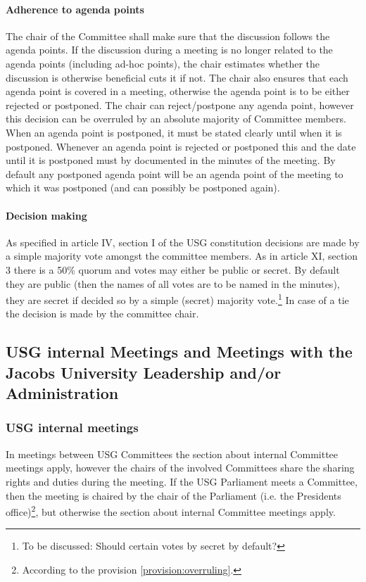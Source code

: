 \paragraph{Adherence to agenda points}
The chair of the Committee shall make sure that the discussion follows the agenda points. If the discussion during a meeting is no longer related to the agenda points (including ad-hoc points), the chair estimates whether the discussion is otherwise beneficial cuts it if not. 
The chair also ensures that each agenda point is covered in a meeting, otherwise the agenda point is to be either rejected or postponed. The chair can reject/postpone any agenda point, however this decision can be overruled by an absolute majority of Committee members. When an agenda point is postponed, it must be stated clearly until when it is postponed. Whenever an agenda point is rejected or postponed this and the date until it is postponed must by documented in the minutes of the meeting. By default any postponed agenda point will be an agenda point of the meeting to which it was postponed (and can possibly be postponed again). 


\paragraph{Decision making}
As specified in article IV, section I of the USG constitution decisions are made by a simple majority vote amongst the committee members. As in article XI, section 3 there is a 50\% quorum and votes may either be public or secret. By default they are public (then the names of all votes are to be named in the minutes), they are secret if decided so by a simple (secret) majority vote.\protect\footnote{To be discussed: Should certain votes by secret by default?} In case of a tie the decision is made by the committee chair.

\subsection[Non-internal Meetings]{USG internal Meetings and Meetings with the Jacobs University Leadership and/or Administration}
\subsubsection{USG internal meetings}
  In meetings between USG Committees the section about internal Committee meetings apply, however the chairs of the involved Committees share the sharing rights and duties during the meeting.
  If the USG Parliament meets a Committee, then the meeting is chaired by the chair of the Parliament (i.e. the Presidents office)\protect\footnote{According to the provision \ref{provision:overruling}.}, but otherwise the section about internal Committee meetings apply.
